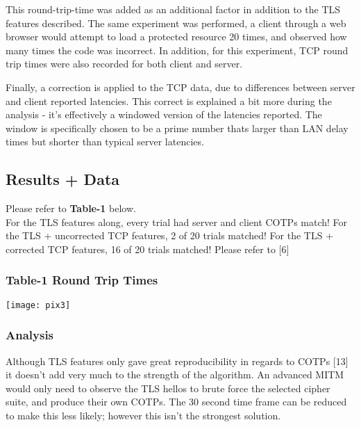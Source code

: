 \documentclass[a4paper, 11pt]{article} 				%
\begin{document}
This round-trip-time was added as an additional factor in addition to the TLS features described. The same experiment was performed, a client through a web browser would attempt to load a protected resource 20 times, and observed how many times the code was incorrect. In addition, for this experiment, TCP round trip times were also recorded for both client and server.

Finally, a correction is applied to the TCP data, due to differences between server and client reported latencies. This correct is explained a bit more during the analysis - it's effectively a windowed version of the latencies reported. The window is specifically chosen to be a prime number thats larger than LAN delay times but shorter than typical server latencies.

\subsection{Results + Data}
\noindent 
Please refer to \textbf{Table-1} below.\\
For the TLS features along, every trial had server and client COTPs match! 
For the TLS + uncorrected TCP features, 2 of 20 trials matched!
For the TLS + corrected TCP features, 16 of 20 trials matched!
Please refer to [6]

\subsubsection{\textbf{Table-1} Round Trip Times}

\texttt{[image: pix3]}





\subsubsection{Analysis}
Although TLS features only gave great reproducibility in regards to COTPs [13] it doesn't add very much to the strength of the algorithm. An advanced MITM would only need to observe the TLS hellos to brute force the selected cipher suite, and produce their own COTPs. The 30 second time frame can be reduced to make this less likely; however this isn't the strongest solution.
\end{document}
